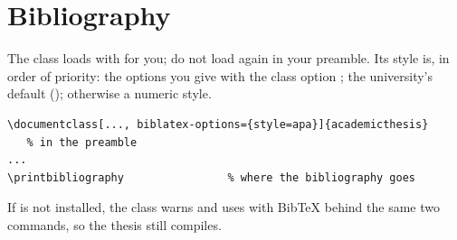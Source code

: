 \section{Bibliography}
\label{sec:bib}

The class loads  with  for you; do not load
 again in your preamble. Its style is, in order of priority:
the options you give with the class option ; the
university's default (\unibibdefault); otherwise a numeric style.

\begin{lstlisting}
\documentclass[..., biblatex-options={style=apa}]{academicthesis}
   % in the preamble
...
\printbibliography                % where the bibliography goes
\end{lstlisting}

If  is not installed, the class warns and uses 
with Bib\TeX{} behind the same two commands, so the thesis still compiles.
